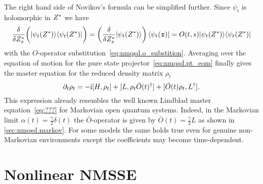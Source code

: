 The right hand side of Novikov's formula can be simplified further.
Since $\psi_t$ is holomorphic in ${Z}^*$ we have
\begin{equation*}
  \frac{\delta}{\delta {Z}^*_s} \bigg( | \psi_t({Z}^*) \rangle\langle \psi_t({Z}^*) | \bigg) = \left( \frac{\delta}{\delta {Z}^*_s} | \psi_t({Z}^*) \rangle \right)\langle \psi_t(\boldsymbol{z}) | = O(t, s) | \psi_t({Z}^*) \rangle\langle \psi_t({Z}^*) |
\end{equation*}
with the $O$-operator substitution~\ref{eq:nmqsd.o_substition}.
Averaging over the equation of motion for the pure state projector~\ref{eq:nmqsd.pt_eom} finally gives the master equation for the reduced density matrix $\rho_t$
\begin{equation}
  \partial_t \rho_t = -\mathrm{i} [H, \rho_t]  +  [L, \rho_t \bar O(t)^\dagger]  +  [\bar O(t) \rho_t, L^\dagger].
  \label{eq:nmqsd.master}
\end{equation}
This expression already resembles the well known Lindblad master equation~\ref{eq:???} for Markovian open quantum systems.
Indeed, in the Markovian limit $\alpha(t) = \frac{\gamma}{2}\delta(t)$ the $\bar O$-operator is given by $\bar O(t) = \frac{\gamma}{2} L$ as shown in \autoref{sec:nmqsd.markov}.
For some models the same holds true even for genuine non-Markovian environments except the coefficients may become time-dependent.



\section{Nonlinear NMSSE}
\label{sec:nmqsd.nonlin_nmsse}
%

